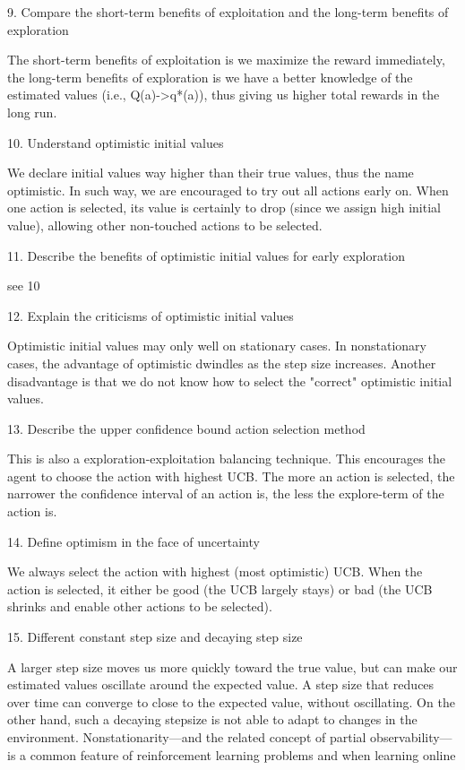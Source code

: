 \documentclass[sutton_barto_notes.tex]{subfiles}
\begin{document}
9. Compare the short-term benefits of exploitation and the long-term benefits of exploration

The short-term benefits of exploitation is we maximize the reward immediately, the long-term benefits of exploration is we have a better knowledge of the estimated values (i.e., Q(a)->q*(a)), thus giving us higher total rewards in the long run.

10. Understand optimistic initial values

We declare initial values way higher than their true values, thus the name optimistic. In such way, we are encouraged to try out all actions early on. When one action is selected, its value is certainly to drop (since we assign high initial value), allowing other non-touched actions to be selected.

11. Describe the benefits of optimistic initial values for early exploration

see 10

12. Explain the criticisms of optimistic initial values

Optimistic initial values may only well on stationary cases. In nonstationary cases, the advantage of optimistic dwindles as the step size increases.
Another disadvantage is that we do not know how to select the "correct" optimistic initial values.

13. Describe the upper confidence bound action selection method

This is also a exploration-exploitation balancing technique. This encourages the agent to choose the action with highest UCB. The more an action is selected, the narrower the confidence interval of an action is, the less the explore-term of the action is.

14. Define optimism in the face of uncertainty

We always select the action with highest (most optimistic) UCB. When the action is selected, it either be good (the UCB largely stays) or bad (the UCB shrinks and enable other actions to be selected).


15. Different constant step size and decaying step size

A larger step size moves us more quickly toward the true value, but can make our estimated values oscillate around the expected value. A step size that reduces over time can converge to close to the expected value, without oscillating. On the other hand, such a decaying stepsize is not able to adapt to changes in the environment. Nonstationarity---and the related concept of partial observability---is a common feature of reinforcement learning problems and when learning online
\end{document}
